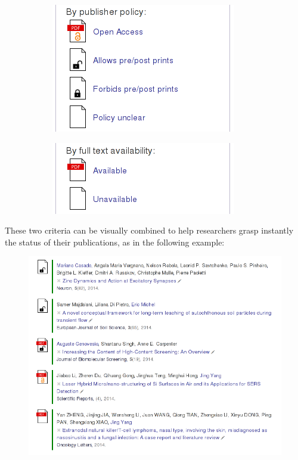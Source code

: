 \documentclass[a4paper]{article}
\begin{document}
\begin{figure}[htbp]
\centering
\begin{subfigure}[b]{0.45\textwidth}
\includegraphics[scale=0.5]{img/policy.png}
\end{subfigure}
\begin{subfigure}[b]{0.45\textwidth}
\includegraphics[scale=0.5]{img/availability.png}
\vspace{0.4cm}
\end{subfigure}
\end{figure}

These two criteria can be visually combined to help researchers grasp
instantly the status of their publications, as in the following example:

\begin{figure}[htbp]
\centering
\includegraphics[scale=0.5]{img/publist.png}
\end{figure}
\end{document}
